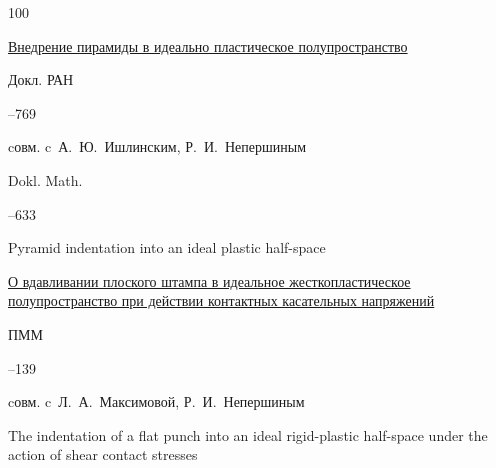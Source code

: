 \begin{thebibliography}{100}








\paper \href{http://mi.mathnet.ru/dan2039}{Внедрение пирамиды в идеально пластическое полупространство}

\jour Докл. РАН




--769

\miscnote cовм. c~А.~Ю.~Ишлинским, Р.~И.~Непершиным



\transl


\jour Dokl. Math.




--633

\paper Pyramid indentation into an ideal plastic half-space







\paper \href{https://zbmath.org/?q=an:1094.74665}{О вдавливании плоского штампа в идеальное жесткопластическое полупространство при действии контактных касательных напряжений}

\jour ПММ




–139 

\miscnote cовм. c~Л.~А.~Максимовой, Р.~И.~Непершиным


\transl


\paper The indentation of a flat punch into an ideal rigid-plastic half-space under the action of shear contact stresses


\end{thebibliography}
